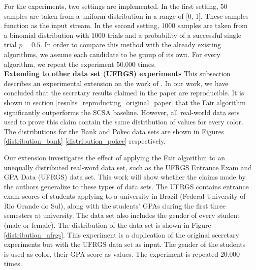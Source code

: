 For the experiments, two settings are implemented. In the first setting, 50 samples are taken from a uniform distribution in a range of [0, 1]. These samples function as the input stream. In the second setting, 1000 samples are taken from a binomial distribution with 1000 trials and a probability of a successful single trial $p = 0.5$. In order to compare this method with the already existing algorithms, we assume each candidate to be group of its own. For every algorithm, we repeat the experiment 50.000 times.\\

\textbf{Extending to other data set (UFRGS) experiments}
\FloatBarrier
\label{Work_beyond_original_paper}
This subsection describes an experimental extension on the work of \cite{correa2021fairness}. In our work, we have concluded that the secretary results claimed in the paper are reproducible. It is shown in section \ref{results_reproducting_original_paper} that the Fair algorithm significantly outperforms the SCSA baseline. However, all real-world data sets used to prove this claim contain the same distribution of values for every color. The distributions for the Bank and Pokec data sets are shown in Figures \ref{distribution_bank} \ref{distribution_pokec} respectively.

Our extension investigates the effect of applying the Fair algorithm to an unequally distributed real-word data set, such as the UFRGS Entrance Exam and GPA Data (UFRGS) data set. This work will show whether the claims made by the authors generalize to these types of data sets. The UFRGS contains entrance exam scores of students applying to a university in Brazil (Federal University of Rio Grande do Sul), along with the students' GPAs during the first three semesters at university. The data set also includes the gender of every student (male or female).
The distribution of the data set is shown in Figure \ref{distribution_ufrgs}. This experiment is a duplication of the original secretary experiments but with the UFRGS data set as input. The gender of the students is used as color, their GPA score as values. The experiment is repeated 20.000 times.

